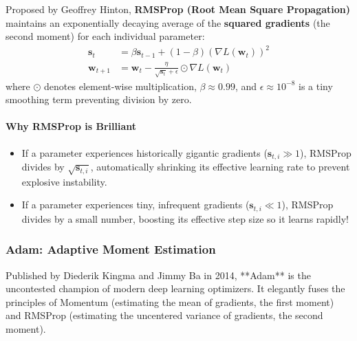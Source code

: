 Proposed by Geoffrey Hinton, \textbf{RMSProp (Root Mean Square Propagation)} maintains an exponentially decaying average of the \textbf{squared gradients} (the second moment) for each individual parameter:
\begin{align}
\mathbf{s}_t &= \beta \mathbf{s}_{t-1} + (1 - \beta) \left( \nabla L(\mathbf{w}_t) \right)^2 \label{eq:rmsprop_second_moment}\\
\mathbf{w}_{t+1} &= \mathbf{w}_t - \frac{\eta}{\sqrt{\mathbf{s}_t} + \epsilon} \odot \nabla L(\mathbf{w}_t) \label{eq:rmsprop_update}
\end{align}
where $\odot$ denotes element-wise multiplication, $\beta \approx 0.99$, and $\epsilon \approx 10^{-8}$ is a tiny smoothing term preventing division by zero.

\paragraph{Why RMSProp is Brilliant}
\begin{itemize}
    \item If a parameter experiences historically gigantic gradients ($\mathbf{s}_{t, i} \gg 1$), RMSProp divides by $\sqrt{\mathbf{s}_{t, i}}$, automatically shrinking its effective learning rate to prevent explosive instability.
    \item If a parameter experiences tiny, infrequent gradients ($\mathbf{s}_{t, i} \ll 1$), RMSProp divides by a small number, boosting its effective step size so it learns rapidly!
\end{itemize}

\subsubsection{Adam: Adaptive Moment Estimation}
Published by Diederik Kingma and Jimmy Ba in 2014, **Adam** is the uncontested champion of modern deep learning optimizers. It elegantly fuses the principles of Momentum (estimating the mean of gradients, the first moment) and RMSProp (estimating the uncentered variance of gradients, the second moment).

